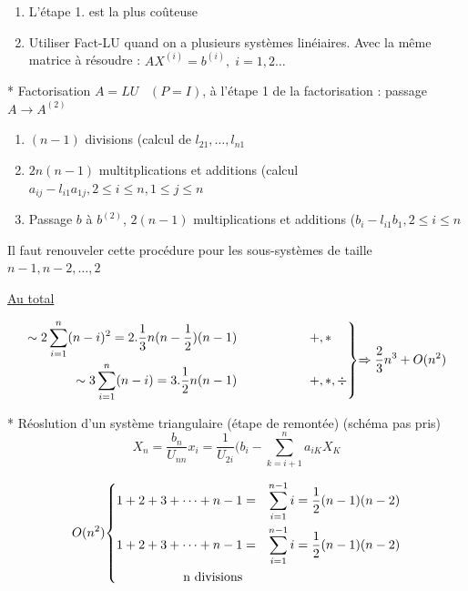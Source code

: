 \documentclass[a4paper,11pt]{article}
\newenvironment{rcases}
  {\left.\begin{aligned}}
  {\end{aligned}\right\rbrace}
\newenvironment{lcases}
  {\left\lbrace\begin{aligned}}
  {\end{aligned}\right.}
\theoremstyle{plain} %
\begin{document}
\vspace{1cm}
\begin{remark}
    \begin{enumerate}
        \item L'étape 1. est la plus coûteuse
        \item Utiliser Fact-LU quand on a plusieurs systèmes linéiaires. Avec la même matrice à résoudre : $AX^{(i)}=b^{(i)}, \; i = 1,2 \dots$
    \end{enumerate}
\end{remark}

\vspace{1cm}

* Factorisation $A=LU \; \; \; (P=I)$, à l'étape 1 de la factorisation : passage $A \to A^{(2)}$

\begin{enumerate}
    \item $(n-1)$ divisions (calcul de $l_{21}, \dots, l_{n1}$
    \item $2n(n-1)$ multitplications et additions (calcul $a_{ij}-l_{i1}a_{1j}, 2 \leq i \leq n, 1 \leq j \leq n$
    \item Passage $b$ à $b^{(2)}$, $2(n-1)$ multiplications et additions ($b_i - l_{i1}b_{1}, 2 \leq i \leq n$
\end{enumerate}

Il faut renouveler cette procédure pour les sous-systèmes de taille $n-1,n-2,\dots,2$

\underline{Au total}

\begin{equation*}
    \begin{rcases}
        \sim 2 \sum_{i=1}^n (n-i)^2 = 2.\frac{1}{3}n (n-\frac{1}{2})(n-1) \hspace{2cm}& +, *\\
        \sim 3 \sum_{i=1}^n (n-i) = 3.\frac{1}{2}n(n-1) \hspace{2cm} & +,*,\div
    \end{rcases}
    \text{$\Rightarrow \frac{2}{3}n^3+O(n^2)$}
\end{equation*}

* Réoslution d'un système triangulaire (étape de remontée)
(schéma pas pris)
\[
    X_n = \frac{b_n}{U_{nn}}
    x_i = \frac{1}{U_{2i}}(b_i - \sum_{k=i+1}^n a_{iK}X_K
\]

\begin{equation*}
    \text{$O(n^2)$}
    \begin{lcases}
        1 + 2 + 3 + \dots + n - 1 & = & \sum_{i=1}^{n-1}i = \frac{1}{2}(n-1)(n-2)\\
        1 + 2 + 3 + \dots + n - 1 & = & \sum_{i=1}^{n-1}i = \frac{1}{2}(n-1)(n-2)\\
        \text{n divisions}
    \end{lcases}
\end{equation*}
\end{document}
